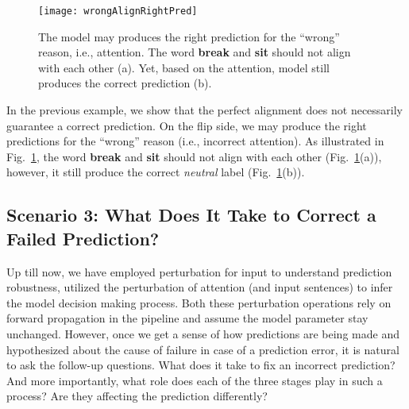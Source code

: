 \begin{figure}[htbp]
\centering
\vspace{-2mm}
 \texttt{[image: wrongAlignRightPred]}
 \caption{
The model may produces the right prediction for the ``wrong'' reason, i.e., attention.
The word \textbf{break} and \textbf{sit} should not align with each other (a). Yet, based on the attention, model still produces the correct prediction (b).
}
\label{fig:wrongAlignRightPred}
\end{figure}


In the previous example, we show that the perfect alignment does not necessarily guarantee a correct prediction.
%
On the flip side, we may produce the right predictions for the ``wrong'' reason (i.e., incorrect attention). 
As illustrated in Fig.~\ref{fig:wrongAlignRightPred}, the word \textbf{break} and \textbf{sit} should not align with each other (Fig.~\ref{fig:wrongAlignRightPred}(a)), however, it still produce the correct \emph{neutral} label (Fig.~\ref{fig:wrongAlignRightPred}(b)).
%






\subsection{Scenario 3: What Does It Take to Correct a Failed Prediction?}
Up till now, we have employed perturbation for input to understand prediction robustness, utilized the perturbation of attention (and input sentences) to infer the model decision making process. Both these perturbation operations rely on forward propagation in the pipeline and assume the model parameter stay unchanged.
%
However, once we get a sense of how predictions are being made and hypothesized about the cause of failure in case of a prediction error, it is natural to ask the follow-up questions. What does it take to fix an incorrect prediction? And more importantly, what role does each of the three stages play in such a process? Are they affecting the prediction differently?

